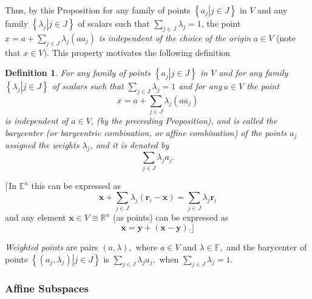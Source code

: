 \documentclass[aps,preprint]{revtex4}%
\newtheorem{definition}[theorem]{Definition}
\begin{document}
Thus, by this Proposition for any family of points $\left\{  \left.
a_{j}\right\vert j\in J\right\}  $ in $V$ and any family $\left\{  \left.
\lambda_{j}\right\vert j\in J\right\}  $ of scalars such that $\sum_{j\in
J}\lambda_{j}=1$, the point $x=a+\sum_{j\in J}\lambda_{j}\left(
aa_{j}\right)  $ \emph{is independent of the choice of the origin} $a\in V$
(note that $x\in V).$ This property motivates the following definition

\begin{definition}
For any family of points $\left\{  \left.  a_{j}\right\vert j\in J\right\}  $
in $V$ and for any family $\left\{  \left.  \lambda_{j}\right\vert j\in
J\right\}  $ of scalars such that $\sum_{j\in J}\lambda_{j}=1$ and for
any$\ a\in V$ the point
\begin{equation}
x=a+\sum_{j\in J}\lambda_{j}\left(  aa_{j}\right)
\end{equation}
is independent of $a\in V$, (by the preceeding Proposition), and is called the
\emph{barycenter} (or \emph{barycentric combination}, or \emph{affine
combination}) of the points $a_{j}$ assigned the weights $\lambda_{j}$, and it
is denoted by
\begin{equation}
\sum_{j\in J}\lambda_{j}a_{j}.
\end{equation}

\end{definition}

$\lceil$In $\mathbb{E}^{n}$ this can be expressed as
\begin{equation}
\mathbf{x}+\sum_{j\in J}\lambda_{j}\left(  \mathbf{r}_{i}-\mathbf{x}\right)
=\sum_{j\in J}\lambda_{j}\mathbf{r}_{i}%
\end{equation}
and any element $\mathbf{x\in}V\cong\mathbb{R}^{n}$ (as points) can be
expressed as
\begin{equation}
\mathbf{x}=\mathbf{y}+\left(  \mathbf{x-y}\right)  .\rfloor
\end{equation}


\emph{Weighted points} are pairs $\left(  a,\lambda\right)  ,$ where $a\in V$
and $\lambda\in\mathbb{F},$ and the barycenter of points $\left\{  \left.
\left(  a_{j},\lambda_{j}\right)  \right\vert j\in J\right\}  $ is $\sum_{j\in
J}\lambda_{j}a_{j},$ when $\sum_{j\in J}\lambda_{j}=1.$

\subsubsection{Affine Subspaces}
\end{document}
